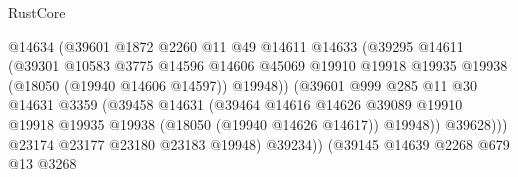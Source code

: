 \begin{lexlean}{RustCore}
\begin{coremodule}
                                      @14634
                                      (@39601
                                        @1872
                                        @2260
                                        @11
                                        @49
                                        @14611
                                        @14633
                                        (@39295
                                          @14611
                                          (@39301
                                            @10583
                                            @3775
                                            @14596
                                            @14606
                                            @45069
                                            @19910
                                            @19918
                                            @19935
                                            @19938
                                            (@18050 (@19940 @14606 @14597))
                                            @19948))
                                        (@39601
                                          @999
                                          @285
                                          @11
                                          @30
                                          @14631
                                          @3359
                                          (@39458
                                            @14631
                                            (@39464
                                              @14616
                                              @14626
                                              @39089
                                              @19910
                                              @19918
                                              @19935
                                              @19938
                                              (@18050 (@19940 @14626 @14617))
                                              @19948))
                                          @39628)))
                                    @23174
                                    @23177
                                    @23180
                                    @23183
                                    @19948)
                                  @39234))
                              (@39145
                                @14639
                                @2268
                                @679
                                @13
                                @3268

\end{coremodule}
\end{lexlean}
